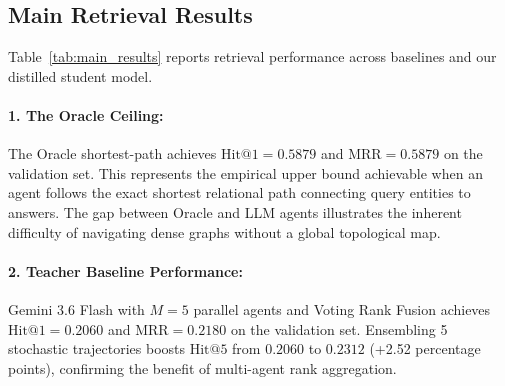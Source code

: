 \documentclass[11pt]{article}
\begin{document}
\begin{table}[t]
\centering
\small
{}
\caption{Retrieval performance on STaRK-PrimeKG across Oracle, Teacher, and Distilled student model. Multi-agent ensembles use Voting Rank Fusion ($\kappa=60$).}
\label{tab:main_results}
\end{table}

\subsection{Main Retrieval Results}
Table~\ref{tab:main_results} reports retrieval performance across baselines and our distilled student model.

\paragraph{1. The Oracle Ceiling:}
The Oracle shortest-path achieves $\text{Hit@1} = 0.5879$ and $\text{MRR} = 0.5879$ on the validation set. This represents the empirical upper bound achievable when an agent follows the exact shortest relational path connecting query entities to answers. The gap between Oracle and LLM agents illustrates the inherent difficulty of navigating dense graphs without a global topological map.

\paragraph{2. Teacher Baseline Performance:}
Gemini 3.6 Flash with $M=5$ parallel agents and Voting Rank Fusion achieves $\text{Hit@1} = 0.2060$ and $\text{MRR} = 0.2180$ on the validation set. Ensembling 5 stochastic trajectories boosts $\text{Hit@5}$ from $0.2060$ to $0.2312$ (+2.52 percentage points), confirming the benefit of multi-agent rank aggregation.
\end{document}
